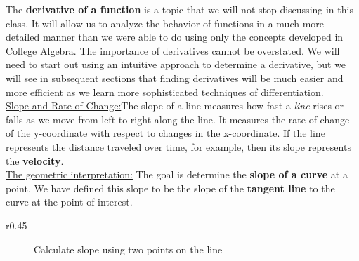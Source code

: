 \newpage
\noindent The \textbf{derivative of a function} is a topic that we will not stop discussing in this class.  It will allow us to analyze the behavior of functions in a much more detailed manner than we were able to do using only the concepts developed in College Algebra.  The importance of derivatives cannot be overstated.  We will need to start out using an intuitive approach to determine a derivative, but we will see in subsequent sections that finding derivatives will be much easier and more efficient as we learn more sophisticated techniques of differentiation.  \\

\noindent \underline{Slope and Rate of Change:}The slope of a line measures how fast a \emph{line} rises or falls as we move from left to right along the line.  It measures the rate of change of the y-coordinate with respect to changes in the x-coordinate. If the line represents the distance traveled over time, for example, then its slope represents the \textbf{velocity}.\\

\noindent \underline{The geometric interpretation:} The goal is determine the \textbf{slope of a curve} at a point.  We have defined this slope to be the slope of the \textbf{tangent line} to the curve at the point of interest. \\

\begin{wrapfigure}[4]{r}{0.45\textwidth}

\begin{figure}[H]
\center
{}
\caption{Calculate slope using two points on the line}
\label{fig:line}
\end{figure}
\end{wrapfigure}

